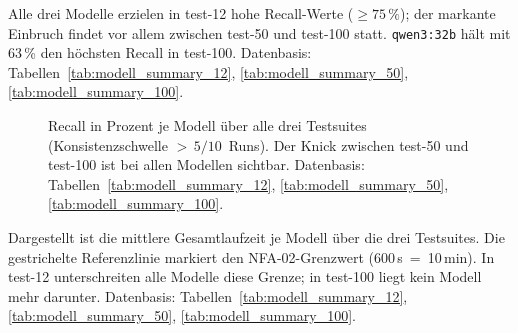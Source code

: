 \noindent Alle drei Modelle erzielen in test-12 hohe Recall-Werte ($\geq 75\,\%$); der markante Einbruch findet vor allem zwischen test-50 und test-100 statt. \texttt{qwen3:32b} hält mit 63\,\% den höchsten Recall in test-100. Datenbasis: Tabellen~\ref{tab:modell_summary_12}, \ref{tab:modell_summary_50}, \ref{tab:modell_summary_100}.

\begin{figure}[htbp]
\centering
{}
\caption[Recall-Degradation im Suite-Vergleich]{Recall in Prozent je Modell über alle drei Testsuites (Konsistenzschwelle $>\,5/10$~Runs). Der Knick zwischen test-50 und test-100 ist bei allen Modellen sichtbar. Datenbasis: Tabellen~\ref{tab:modell_summary_12}, \ref{tab:modell_summary_50}, \ref{tab:modell_summary_100}.}
\label{fig:graph_recall}
\end{figure}


\clearpage

\label{app:graph_laufzeit}

\noindent Dargestellt ist die mittlere Gesamtlaufzeit je Modell über die drei Testsuites. Die gestrichelte Referenzlinie markiert den \ac{NFA}-02-Grenzwert (600\,s~=~10\,min). In test-12 unterschreiten alle Modelle diese Grenze; in test-100 liegt kein Modell mehr darunter. Datenbasis: Tabellen~\ref{tab:modell_summary_12}, \ref{tab:modell_summary_50}, \ref{tab:modell_summary_100}.

